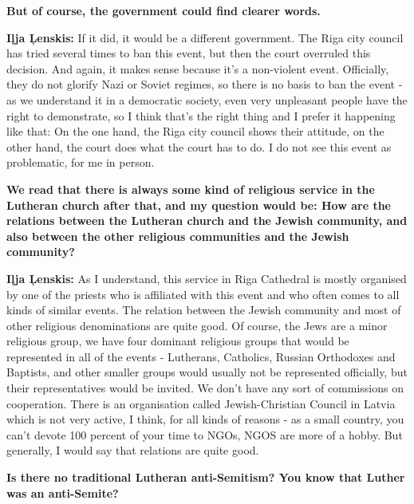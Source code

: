 \textbf{But of course, the government could find clearer words.} 

\textbf{Iļja Ļenskis:} If it did, it would be a different government. The Riga city council  has tried several times to ban this event, but then the court overruled this decision. And again, it makes sense because it’s a non-violent event. Officially, they do not glorify Nazi or Soviet regimes, so there is no basis to ban the event - as we understand it in a democratic society, even very unpleasant people have the right to demonstrate, so I think that’s the right thing and I prefer it happening like that: On the one hand, the Riga city council shows their attitude, on the other hand, the court does what the court has to do. I do not see this event as problematic, for me in person.

\textbf{We read that there is always some kind of religious service in the Lutheran church after that, and my question would be: How are the relations between the Lutheran church and the Jewish community, and also between the other religious communities and the Jewish community?}

\textbf{Iļja Ļenskis:} As I understand, this service in Riga Cathedral is mostly organised by one of the priests who is affiliated with this event and who often comes to all kinds of similar events. The relation between the Jewish community and most of other religious denominations are quite good. Of course, the Jews are a minor religious group, we have four dominant religious groups that would be represented in all of the events - Lutherans, Catholics, Russian Orthodoxes and Baptists, and other smaller groups would usually not be represented officially, but their representatives would be invited. We don’t have any sort of commissions on cooperation. There is an organisation called Jewish-Christian Council in Latvia which is not very active, I think, for all kinds of reasons - as a small country, you can’t devote 100 percent of your time to NGOs, NGOS are more of a hobby. But generally, I would say that relations are quite good. 

\textbf{Is there no traditional Lutheran anti-Semitism? You know that Luther was an anti-Semite?} 

